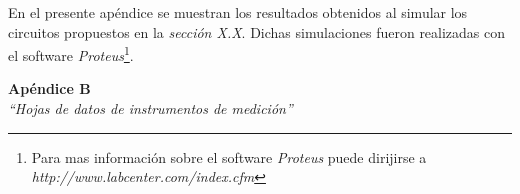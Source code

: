 \documentclass{article}
\begin{document}
	En el presente apéndice se muestran los resultados obtenidos al simular los circuitos propuestos en la \textit{sección X.X}. Dichas simulaciones fueron realizadas con el software \textit{Proteus}\footnote{Para mas información sobre el software \textit{Proteus} puede dirijirse a \textit{http://www.labcenter.com/index.cfm}}.
\bigskip \bigskip





\newpage
\vspace*{4cm}
\begin{center}
	\textbf{\Huge{Apéndice B}} \\
	\bigskip\bigskip
	\Large{\textit{``Hojas de datos de instrumentos de medición''}}
\end{center}
\end{document}
